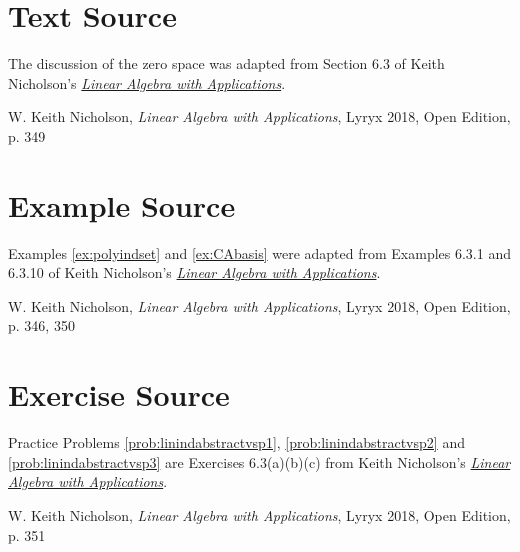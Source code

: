 \documentclass{ximera}
\begin{document}
\section*{Text Source} The discussion of the zero space was adapted from Section 6.3 of Keith Nicholson's \href{https://open.umn.edu/opentextbooks/textbooks/linear-algebra-with-applications}{\it Linear Algebra with Applications}.

W. Keith Nicholson, {\it Linear Algebra with Applications}, Lyryx 2018, Open Edition, p. 349 

\section*{Example Source}
Examples \ref{ex:polyindset} and \ref{ex:CAbasis} were adapted from Examples 6.3.1 and 6.3.10 of Keith Nicholson's \href{https://open.umn.edu/opentextbooks/textbooks/linear-algebra-with-applications}{\it Linear Algebra with Applications}.

W. Keith Nicholson, {\it Linear Algebra with Applications}, Lyryx 2018, Open Edition, p. 346, 350

\section*{Exercise Source}
Practice Problems \ref{prob:linindabstractvsp1}, \ref{prob:linindabstractvsp2} and \ref{prob:linindabstractvsp3} are Exercises 6.3(a)(b)(c) from Keith Nicholson's \href{https://open.umn.edu/opentextbooks/textbooks/linear-algebra-with-applications}{\it Linear Algebra with Applications}.

W. Keith Nicholson, {\it Linear Algebra with Applications}, Lyryx 2018, Open Edition, p. 351
\end{document}
